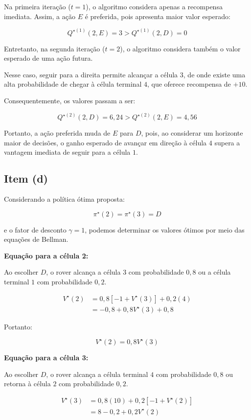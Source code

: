 Na primeira iteração ($t=1$), o algoritmo
considera apenas a recompensa imediata.
Assim, a ação $E$ é preferida, pois apresenta
maior valor esperado:

\[
Q^{\star(1)}(2,E)=3
>
Q^{\star(1)}(2,D)=0
\]

Entretanto, na segunda iteração ($t=2$),
o algoritmo considera também o valor
esperado de uma ação futura.

Nesse caso, seguir para a direita permite
alcançar a célula $3$, de onde existe
uma alta probabilidade de chegar à
célula terminal $4$, que oferece
recompensa de $+10$.

Consequentemente, os valores passam a ser:

\[
Q^{\star(2)}(2,D)=6{,}24
>
Q^{\star(2)}(2,E)=4{,}56
\]

Portanto, a ação preferida muda de $E$
para $D$, pois, ao considerar um horizonte
maior de decisões, o ganho esperado de
avançar em direção à célula $4$ supera
a vantagem imediata de seguir para
a célula $1$.


\subsection{Item (d)}

Considerando a política ótima proposta:

\[
    \pi^\star(2)=\pi^\star(3)=D
\]

e o fator de desconto $\gamma=1$,
podemos determinar os valores ótimos
por meio das equações de Bellman.

\textbf{Equação para a célula 2:}

Ao escolher $D$, o rover alcança a célula $3$
com probabilidade $0{,}8$ ou a célula terminal
$1$ com probabilidade $0{,}2$.

\[
\begin{aligned}
V^\star(2)
&=0{,}8[-1+V^\star(3)]
+0{,}2(4)\\
&=-0{,}8+0{,}8V^\star(3)+0{,}8
\end{aligned}
\]

Portanto:

\[
    V^\star(2)=0{,}8V^\star(3)
\]

\textbf{Equação para a célula 3:}

Ao escolher $D$, o rover alcança a célula
terminal $4$ com probabilidade $0{,}8$
ou retorna à célula $2$ com probabilidade
$0{,}2$.

\[
\begin{aligned}
V^\star(3)
&=0{,}8(10)+0{,}2[-1+V^\star(2)]\\
&=8-0{,}2+0{,}2V^\star(2)
\end{aligned}
\]

